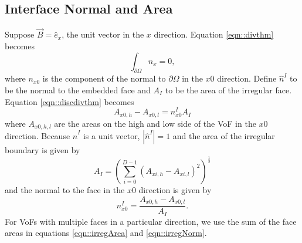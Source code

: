 \subsection{Interface Normal and Area}

Suppose $\vec B = \hat e_x$, the unit vector in the $x$ direction.
Equation \ref{eqn::divthm} becomes 
\begin{equation}
 \int_{\partial \Omega} n_x = 0,
\end{equation}
where $n_{x0}$ is the component of the normal to $\partial \Omega$ 
in the $x0$ direction.  Define $\hat n^I$ to be the normal to 
the embedded face and $A_I$ to be the area of the irregular
face.  Equation \ref{eqn::discdivthm} becomes
\begin{equation}
A_{x0,h} - A_{x0,l} = n^I_{x0} A_I
\end{equation}
where $A_{x0,h,l}$ are the areas on the high and low side of the VoF 
in the $x0$ direction.
Because $\hat n^I$ is a unit vector, $|\hat n^I| = 1$ and the 
area of the irregular boundary is given by
\begin{equation}
A_I = (\sum\limits^{D-1}_{i=0} (A_{xi,h} - A_{xi,l})^2 )^{\frac{1}{2}}
\label{eqn::irregArea}
\end{equation}
and the normal to the face in the $x0$ direction is given by
\begin{equation}
n^I_{x0} = \frac{ A_{x0,h} - A_{x0,l} }{ A_I}.
\label{eqn::irregNorm}
\end{equation}
For VoFs with multiple faces in a particular direction, we use
the sum of the face areas in equations \ref{eqn::irregArea} 
and \ref{eqn::irregNorm}.  

